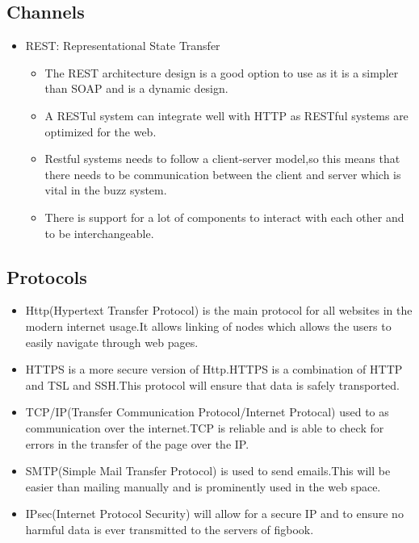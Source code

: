 
%
\subsection{Channels}
\begin{itemize}
\item REST: Representational State Transfer
\begin{itemize}
\item The REST architecture design is a good option to use as it is a simpler than SOAP and is a dynamic design.
\item A RESTul system can integrate well with HTTP as RESTful systems are optimized for the web.
\item Restful systems needs to follow a client-server model,so this means that there needs to be communication between the client and server which is vital in the buzz system.
\item There is support for a lot of components to interact with each other and to be interchangeable.
\end{itemize}
\end{itemize}
\subsection{Protocols}
\begin{itemize}
\item Http(Hypertext Transfer Protocol) is the main protocol for all websites in the modern internet usage.It allows linking of nodes which allows the users to easily navigate through web pages.
\item HTTPS is a more secure version of Http.HTTPS is a combination of HTTP and TSL and SSH.This protocol will ensure that data is safely transported.
\item TCP/IP(Transfer Communication Protocol/Internet Protocal) used to as communication over the internet.TCP is reliable and is able to check for errors in the transfer of the page over the IP.
\item SMTP(Simple Mail Transfer Protocol) is used to send emails.This will be easier than mailing manually and is prominently used in the web space.
\item IPsec(Internet Protocol Security) will allow for a secure IP and to ensure no harmful data is ever transmitted to the servers of figbook.
\end{itemize}


